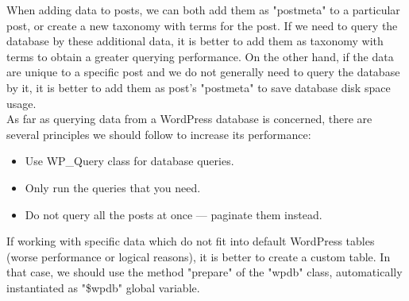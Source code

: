 When adding data to posts, we can both add them as "postmeta" to a particular post, or create a new taxonomy with terms for the post. If we need to query the database by these additional data, it is better to add them as taxonomy with terms to obtain a greater querying performance. On the other hand, if the data are unique to a specific post and we do not generally need to query the database by it, it is better to add them as post's "postmeta" to save database disk space usage. \cite{Otto:Taxonomy-vs-Postmeta} \\

As far as querying data from a WordPress database is concerned, there are several principles we should follow to increase its performance: \cite{10up:Database-Performance}

\begin{itemize}
	\item Use WP\_Query class for database queries.
	\item Only run the queries that you need.
	\item Do not query all the posts at once — paginate them instead.
\end{itemize}

If working with specific data which do not fit into default WordPress tables (worse performance or logical reasons), it is better to create a custom table. In that case, we should use the method "prepare" of the "wpdb" class, automatically instantiated as "\$wpdb" global variable.
